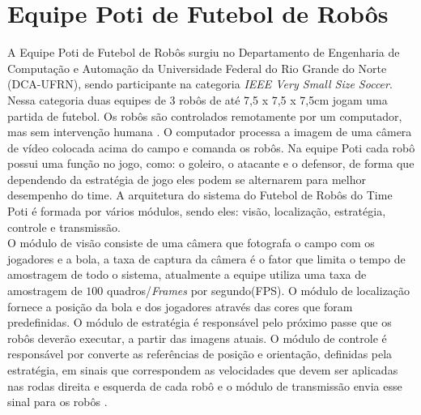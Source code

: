 \section{Equipe Poti de Futebol de Robôs}
\label{sec:Equipe_Poti}

A Equipe Poti de Futebol de Robôs surgiu no Departamento de Engenharia de Computação e Automação da Universidade Federal do Rio Grande do Norte (DCA-UFRN), sendo participante na categoria \emph{IEEE Very Small Size Soccer}.\\

Nessa categoria duas equipes de 3 robôs de até 7,5 x 7,5 x 7,5cm jogam uma partida de futebol. Os robôs são controlados remotamente por um computador, mas sem intervenção humana \cite{VSSS}. O computador processa a imagem de uma câmera de vídeo colocada acima do campo e comanda os robôs. Na equipe Poti cada robô possui uma função no jogo, como: o goleiro, o atacante e o defensor, de forma que dependendo da estratégia de jogo eles podem se alternarem para melhor desempenho do time. A arquitetura do sistema do Futebol de Robôs do Time Poti é formada por vários módulos, sendo eles: visão, localização, estratégia, controle e transmissão.\\

O módulo de visão consiste de uma câmera que fotografa o campo com os jogadores e a bola, a taxa de captura da câmera é o fator que limita o tempo de amostragem de todo o sistema, atualmente a equipe utiliza uma taxa de amostragem de $100$ quadros/\emph{Frames} por segundo(FPS). O módulo de localização fornece a posição da bola e dos jogadores através das cores que foram predefinidas. O módulo de estratégia é responsável pelo próximo passe que os robôs deverão executar, a partir das imagens atuais. O módulo de controle é responsável por converte as referências de posição e orientação, definidas pela estratégia, em sinais que correspondem as velocidades que devem ser aplicadas nas rodas direita e esquerda de cada robô e o módulo de transmissão envia esse sinal para os robôs \cite{POTI}.\\



